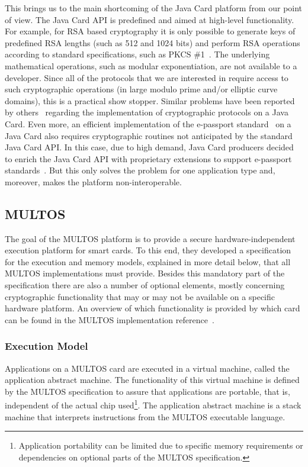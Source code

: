 This brings us to the main shortcoming of the Java Card platform from our point
of view. The Java Card API is predefined and aimed at high-level functionality.
For example, for RSA based cryptography it is only possible to generate keys of
predefined RSA lengths (such as 512 and 1024 bits) and perform RSA operations
according to standard specifications, such as PKCS \#1~\cite{PKCS_1}. The
underlying mathematical operations, such as modular exponentiation, are not
available to a developer. Since all of the protocols that we are interested in
require access to such cryptographic operations (in large modulo prime and/or
elliptic curve domains), this is a practical show stopper. Similar problems have
been reported by others~\cite{BichselCGS2009,Sterckx09} regarding the implementation of
cryptographic protocols on a Java Card. Even more, an efficient implementation
of the e-passport standard~\cite{EAC20} on a Java Card also requires
cryptographic routines not anticipated by the standard Java Card API. In this
case, due to high demand, Java Card producers decided to enrich the Java Card
API with proprietary extensions to support e-passport standards~\cite{NXP09}.
But this only solves the problem for one application type and, moreover, makes
the platform non-interoperable.

\subsection{MULTOS}\label{sec:multos}

The goal of the MULTOS platform is to provide a secure hardware-independent
execution platform for smart cards. To this end, they developed a specification
for the execution and memory models, explained in more detail below, that all
MULTOS implementations must provide. Besides this mandatory part of the
specification there are also a number of optional elements, mostly concerning
cryptographic functionality that may or may not be available on a specific
hardware platform. An overview of which functionality is provided by which card
can be found in the MULTOS implementation reference~\cite{MIR2012}.

\subsubsection{Execution Model}

Applications on a MULTOS card are executed in a virtual machine, called the application abstract machine. The functionality of this
virtual machine is defined by the MULTOS specification to assure that
applications are portable, that is, independent of the actual chip
used\footnote{Application portability can be limited due to specific memory
requirements or dependencies on optional parts of the MULTOS specification.}.
The application abstract machine is a stack machine that
interprets instructions from the MULTOS executable language.

